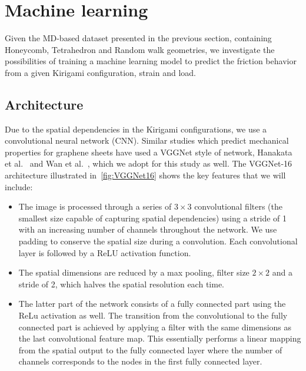 \section{Machine learning}\label{eq:ML}
Given the \acrshort{MD}-based dataset presented in the previous section, containing Honeycomb, Tetrahedron and Random walk geometries, we investigate the possibilities of training a machine learning model to predict the friction behavior from a given Kirigami configuration, strain and load. 

\subsection{Architecture}
Due to the spatial dependencies in the Kirigami configurations, we use a convolutional neural network (\acrshort{CNN}). Similar studies which predict mechanical properties for graphene sheets have used a VGGNet style of network, Hanakata et al.~\cite{PhysRevLett.121.255304, PhysRevResearch.2.042006} and Wan et al.~\cite{graphene/hBN}, which we adopt for this study as well. The VGGNet-16 architecture illustrated in~\cref{fig:VGGNet16} shows the key features that we will include:
\begin{itemize}
  \item The image is processed through a series of $3 \times 3$ convolutional filters (the smallest size capable of capturing spatial dependencies) using a stride of 1 with an increasing number of channels throughout the network. We use padding to conserve the spatial size during a convolution. Each convolutional layer is followed by a ReLU activation function. 
  \item The spatial dimensions are reduced by a max pooling, filter size $2 \times 2$ and a stride of 2, which halves the spatial resolution each time. 
  \item The latter part of the network consists of a fully connected part using the ReLu activation as well. The transition from the convolutional to the fully connected part is achieved by applying a filter with the same dimensions as the last convolutional feature map. This essentially performs a linear mapping from the spatial output to the fully connected layer where the number of channels corresponds to the nodes in the first fully connected layer.
\end{itemize}

